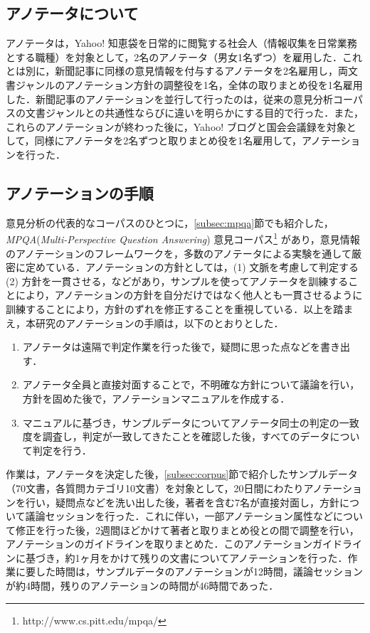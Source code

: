 \documentclass[japanese]{jnlp_1.4}
\begin{document}
\subsection{アノテータについて}

アノテータは，Yahoo! 知恵袋を日常的に閲覧する社会人（情報収集を日常業務とする職種）を対象として，2名のアノテータ（男女1名ずつ）を雇用した．これとは別に，新聞記事に同様の意見情報を付与するアノテータを2名雇用し，両文書ジャンルのアノテーション方針の調整役を1名，全体の取りまとめ役を1名雇用した．新聞記事のアノテーションを並行して行ったのは，従来の意見分析コーパスの文書ジャンルとの共通性ならびに違いを明らかにする目的で行った．また，これらのアノテーションが終わった後に，Yahoo! ブログと国会会議録を対象として，同様にアノテータを2名ずつと取りまとめ役を1名雇用して，アノテーションを行った．


\subsection{アノテーションの手順}
\label{subsec:annotation_methodology}

意見分析の代表的なコーパスのひとつに，\ref{subsec:mpqa}節でも紹介した，{\it MPQA}({\it Multi-Perspective Question Answering}) 意見コーパス\footnote{http://www.cs.pitt.edu/mpqa/} があり，意見情報のアノテーションのフレームワークを，多数のアノテータによる実験を通して厳密に定めている\cite{wiebe2005lre}．アノテーションの方針としては，(1) 文脈を考慮して判定する (2) 方針を一貫させる，などがあり，サンプルを使ってアノテータを訓練することにより，アノテーションの方針を自分だけではなく他人とも一貫させるように訓練することにより，方針のずれを修正することを重視している．以上を踏まえ，本研究のアノテーションの手順は，以下のとおりとした．

\begin{enumerate}
\item アノテータは遠隔で判定作業を行った後で，疑問に思った点などを書き出す．
\item アノテータ全員と直接対面することで，不明確な方針について議論を行い，方針を固めた後で，アノテーションマニュアルを作成する．
\item マニュアルに基づき，サンプルデータについてアノテータ同士の判定の一致度を調査し，判定が一致してきたことを確認した後，すべてのデータについて判定を行う．
\end{enumerate}
作業は，アノテータを決定した後，\ref{subsec:corpus}節で紹介したサンプルデータ（70文書，各質問カテゴリ10文書）を対象として，20日間にわたりアノテーションを行い，疑問点などを洗い出した後，著者を含む7名が直接対面し，方針について議論セッションを行った．これに伴い，一部アノテーション属性などについて修正を行った後，2週間ほどかけて著者と取りまとめ役との間で調整を行い，アノテーションのガイドラインを取りまとめた．このアノテーションガイドラインに基づき，約1ヶ月をかけて残りの文書についてアノテーションを行った．作業に要した時間は，サンプルデータのアノテーションが12時間，議論セッションが約4時間，残りのアノテーションの時間が46時間であった．
\end{document}
